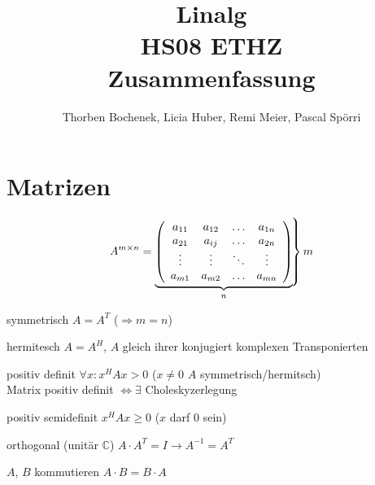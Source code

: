 \documentclass[a4paper,twocolumn]{article}
\title{Linalg\\HS08 ETHZ\\Zusammenfassung}
\author{Thorben Bochenek, Licia Huber, Remi Meier, Pascal Spörri}
\begin{document}

\section{Matrizen}
	
	\vspace{-2mm}
	$$\begin{Large} A^{m \times n}      \end{Large} = 						
		\underbrace{
		\left( \begin{array}{cccc}
			a_{11} 	& a_{12} 	& \ldots 	& a_{1n} \\
			a_{21} 	& a_{ij} 	& \ldots 	& a_{2n} \\
			\vdots 	& \vdots 	& \ddots 	& \vdots \\
			a_{m1}	&a _{m2} 	&  \ldots    	& a_{mn} 
		\end{array} \right)  }_{n} \left. \begin{array}{c} \\ \\ \\ \\ \\ \end{array} \hspace{-5mm} \right\rbrace  m
	$$
		
	\begin{feig}
		\begin{desc_compact}
			\item[symmetrisch] $A = A^{T}$ ($\Rightarrow m = n$)
			\item[hermitesch] $A = A^{H}$, $A$ gleich ihrer konjugiert komplexen Transponierten
			\item[positiv definit] $\forall x: x^H Ax > 0$ ($x \neq 0$ $A$ symmetrisch/hermitsch)\\
				Matrix positiv definit $\Leftrightarrow \exists$ Choleskyzerlegung
			\item[positiv semidefinit] $x^H A x \geqslant 0$ ($x$ darf $0$ sein)
			\item[orthogonal (unitär $\mathbb{C}$)] $A \cdot A^{T} = I \longrightarrow A^{-1} = A^T$
			\item[$A$, $B$ kommutieren] $A \cdot B=B \cdot A$
			
		\end{desc_compact}
			\vspace{-3mm}
	\end{feig}
	
\end{document}
